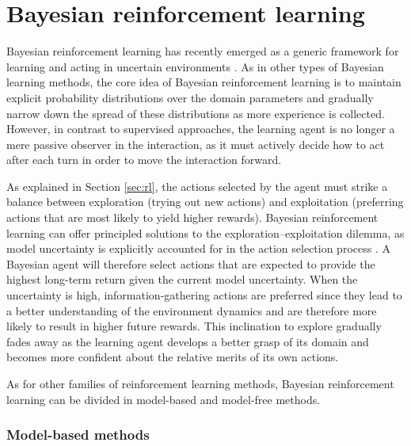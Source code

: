 \section{Bayesian reinforcement learning}
\label{sec:brl}

Bayesian reinforcement learning has recently emerged as a generic framework for learning and acting in uncertain environments \citep{poupart2008,Ross:2011,brl2012}. As in other types of Bayesian learning methods, the core idea of Bayesian reinforcement learning is to maintain explicit probability distributions over the domain parameters and gradually narrow down the spread of these distributions as more experience is collected. However, in contrast to supervised approaches, the learning agent is no longer a mere passive observer in the interaction, as it must actively decide how to act after each turn in order to move the interaction forward. 

As explained in Section \ref{sec:rl}, the actions selected by the agent must strike a balance between exploration (trying out new actions) and exploitation (preferring actions that are most likely to yield higher rewards). Bayesian reinforcement learning can offer principled solutions to the exploration--exploitation dilemma, as model uncertainty is explicitly accounted for in the action selection process \citep{Duff:2002,Ross:2011}.  A Bayesian agent will therefore select actions that are expected to provide the highest long-term return given the current model uncertainty. When the uncertainty is high, information-gathering actions are preferred since they lead to a better understanding of the environment dynamics and are therefore more likely to result in higher future rewards. This inclination to explore gradually fades away as the learning agent develops a better grasp of its domain and becomes more confident about the relative merits of its own actions.

As for other families of reinforcement learning methods, Bayesian reinforcement learning can be divided in model-based and model-free methods. 


\subsubsection*{Model-based methods}

